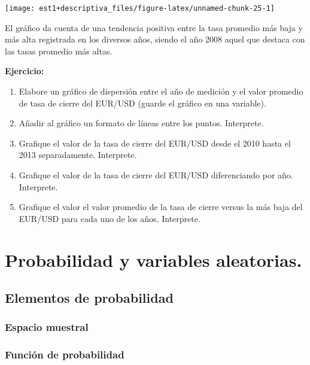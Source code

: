 \documentclass[
]{book}
\providecommand{\tightlist}{%
  \setlength{\itemsep}{0pt}\setlength{\parskip}{0pt}}
\begin{document}
\begin{center}\texttt{[image: est1+descriptiva\_files/figure-latex/unnamed-chunk-25-1]} \end{center}

El gráfico da cuenta de una tendencia positiva entre la tasa promedio más baja y más alta registrada en los diversos años, siendo el año 2008 aquel que destaca con las tasas promedio más altas.

\textbf{Ejercicio:}

\begin{enumerate}
\def\labelenumi{\arabic{enumi}.}
\tightlist
\item
  Elabore un gráfico de dispersión entre el año de medición y el valor promedio de tasa de cierre del EUR/USD (guarde el gráfico en una variable).
\item
  Añadir al gráfico un formato de líneas entre los puntos. Interprete.
\item
  Grafique el valor de la tasa de cierre del EUR/USD desde el 2010 hasta el 2013 separadamente. Interprete.
\item
  Grafique el valor de la tasa de cierre del EUR/USD diferenciando por año. Interprete.
\item
  Grafique el valor el valor promedio de la tasa de cierre versus la más baja del EUR/USD para cada uno de los años. Interprete.
\end{enumerate}

\hypertarget{probabilidad-y-variables-aleatorias.}{%
\chapter{Probabilidad y variables aleatorias.}\label{probabilidad-y-variables-aleatorias.}}

\hypertarget{elementos-de-probabilidad}{%
\section{Elementos de probabilidad}\label{elementos-de-probabilidad}}

\hypertarget{espacio-muestral}{%
\subsection{Espacio muestral}\label{espacio-muestral}}

\hypertarget{funciuxf3n-de-probabilidad}{%
\subsection{Función de probabilidad}\label{funciuxf3n-de-probabilidad}}
\end{document}
